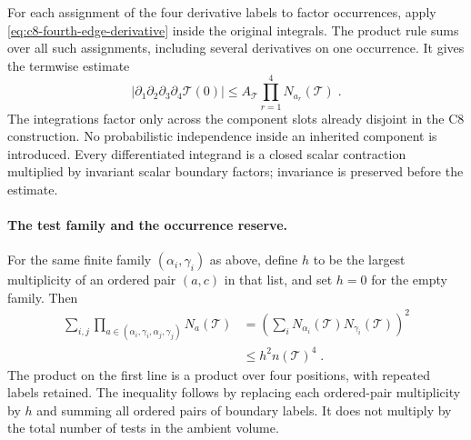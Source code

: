 \documentclass[11pt]{article}
\begin{document}
For each assignment of the four derivative labels to factor
occurrences, apply \eqref{eq:c8-fourth-edge-derivative} inside
the original integrals. The product rule sums over all such
assignments, including several derivatives on one occurrence.
It gives the termwise estimate
\begin{equation}\label{eq:c8-fourth-term-derivative}
    |\partial_1\partial_2\partial_3\partial_4
        \mathcal T(0)|
        \leq A_{\mathcal T}
            \prod_{r=1}^{4}N_{a_r}(\mathcal T)\;.
\end{equation}
The integrations factor only across the component slots already
disjoint in the C8 construction. No probabilistic independence
inside an inherited component is introduced. Every differentiated
integrand is a closed scalar contraction multiplied by invariant
scalar boundary factors; invariance is preserved before the estimate.

\paragraph{The test family and the occurrence reserve.}
For the same finite family $(\alpha_i,\gamma_i)$ as above, define
$h$ to be the largest multiplicity of an ordered pair $(a,c)$ in
that list, and set $h=0$ for the empty family. Then
\begin{equation}\label{eq:c8-fourth-family-count}
    \begin{aligned}
        \sum_{i,j}\prod_{a\in(\alpha_i,\gamma_i,\alpha_j,\gamma_j)}
            N_a(\mathcal T)
            &=\left(\sum_iN_{\alpha_i}(\mathcal T)
                N_{\gamma_i}(\mathcal T)\right)^2\\
            &\leq h^2 n(\mathcal T)^4\;.
    \end{aligned}
\end{equation}
The product on the first line is a product over four positions,
with repeated labels retained. The inequality follows by replacing
each ordered-pair multiplicity by $h$ and summing all ordered pairs
of boundary labels. It does not multiply by the total number of
tests in the ambient volume.
\end{document}
